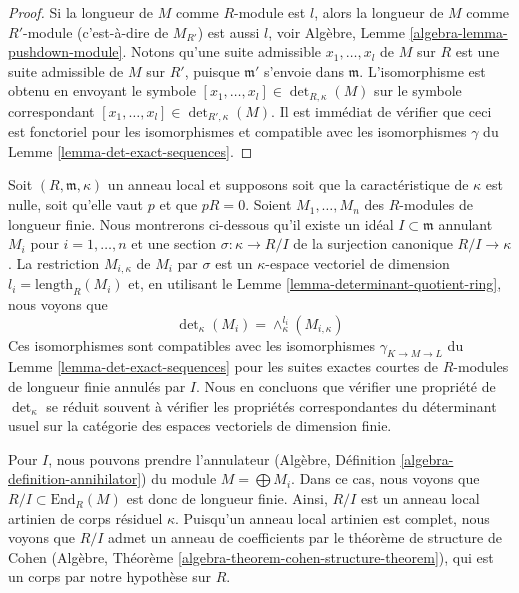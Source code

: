 \begin{proof}
Si la longueur de $M$ comme $R$-module est $l$, alors la longueur
de $M$ comme $R'$-module (c'est-à-dire de $M_{R'}$) est aussi $l$, voir
Algèbre, Lemme \ref{algebra-lemma-pushdown-module}.
Notons qu'une suite admissible $x_1, \ldots, x_l$ de $M$
sur $R$ est une suite admissible de $M$ sur $R'$, puisque $\mathfrak m'$
s'envoie dans $\mathfrak m$.
L'isomorphisme est obtenu en envoyant le symbole
$[x_1, \ldots, x_l] \in \det\nolimits_{R, \kappa}(M)$
sur le symbole correspondant
$[x_1, \ldots, x_l] \in \det\nolimits_{R', \kappa}(M)$.
Il est immédiat de vérifier que ceci est fonctoriel pour les
isomorphismes et compatible avec les isomorphismes
$\gamma$ du Lemme \ref{lemma-det-exact-sequences}.
\end{proof}

\begin{remark}
\label{remark-explain-determinant}
Soit $(R, \mathfrak m, \kappa)$ un anneau local et supposons soit que
la caractéristique de $\kappa$ est nulle, soit qu'elle vaut $p$ et que $p R = 0$.
Soient $M_1, \ldots, M_n$ des $R$-modules de longueur finie.
Nous montrerons ci-dessous qu'il existe un
idéal $I \subset \mathfrak m$ annulant $M_i$ pour $i = 1, \ldots, n$
et une section $\sigma : \kappa \to R/I$ de la surjection canonique
$R/I \to \kappa$. La restriction $M_{i, \kappa}$ de $M_i$ par $\sigma$
est un $\kappa$-espace vectoriel de dimension $l_i = \text{length}_R(M_i)$ et,
en utilisant le Lemme \ref{lemma-determinant-quotient-ring}, nous voyons que
$$
\det\nolimits_\kappa(M_i) = \wedge_\kappa^{l_i}(M_{i, \kappa})
$$
Ces isomorphismes sont compatibles avec les isomorphismes
$\gamma_{K \to M \to L}$ du Lemme \ref{lemma-det-exact-sequences}
pour les suites exactes courtes de $R$-modules de longueur finie annulés
par $I$. Nous en concluons que vérifier une propriété de
$\det_\kappa$ se réduit souvent à vérifier les propriétés correspondantes
du déterminant usuel sur la catégorie des espaces vectoriels de dimension
finie.

\medskip\noindent
Pour $I$, nous pouvons prendre l'annulateur
(Algèbre, Définition \ref{algebra-definition-annihilator})
du module $M = \bigoplus M_i$. Dans ce cas, nous voyons que
$R/I \subset \text{End}_R(M)$ est donc de longueur finie.
Ainsi, $R/I$ est un anneau local artinien de corps résiduel $\kappa$.
Puisqu'un anneau local artinien est complet, nous voyons que $R/I$
admet un anneau de coefficients par le théorème de structure de Cohen
(Algèbre, Théorème \ref{algebra-theorem-cohen-structure-theorem}),
qui est un corps par notre hypothèse sur $R$.
\end{remark}

